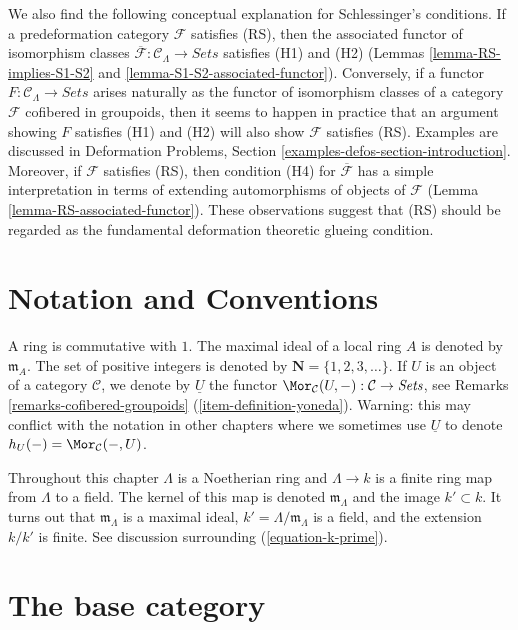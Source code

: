 \medskip\noindent
We also find the following conceptual explanation for Schlessinger's
conditions. If a predeformation category $\mathcal{F}$ satisfies (RS),
then the associated functor of isomorphism classes
$\overline{\mathcal{F}}: \mathcal{C}_\Lambda \to \textit{Sets}$
satisfies (H1) and (H2)
(Lemmas \ref{lemma-RS-implies-S1-S2} and
\ref{lemma-S1-S2-associated-functor}).
Conversely, if a functor
$F : \mathcal{C}_\Lambda \to \textit{Sets}$
arises naturally as the functor of isomorphism classes of
a category $\mathcal{F}$ cofibered in groupoids, then it seems to happen in
practice that an argument showing $F$ satisfies (H1) and (H2) will also show
$\mathcal{F}$ satisfies (RS). Examples are discussed in
Deformation Problems, Section
\ref{examples-defos-section-introduction}.
Moreover, if $\mathcal{F}$ satisfies (RS), then condition
(H4) for $\overline{\mathcal{F}}$ has a simple interpretation in terms of
extending automorphisms of objects of $\mathcal{F}$
(Lemma \ref{lemma-RS-associated-functor}).
These observations suggest that (RS) should be regarded as the
fundamental deformation theoretic glueing condition.




\section{Notation and Conventions}
\label{section-notations-conventions}

\noindent
A ring is commutative with $1$. The  maximal ideal of a local ring $A$
is denoted by $\mathfrak{m}_A$. The set of positive integers is denoted
by $\mathbf{N} = \{1, 2, 3, \ldots\}$. If $U$ is an object of a
category $\mathcal{C}$, we denote by $\underline{U}$
the functor
$\Mor_\mathcal{C}(U, -): \mathcal{C} \to \textit{Sets}$, see
Remarks \ref{remarks-cofibered-groupoids} (\ref{item-definition-yoneda}).
Warning: this may conflict with the notation in other chapters where we
sometimes use $\underline{U}$ to denote $h_U(-) = \Mor_\mathcal{C}(-, U)$.

\medskip\noindent
Throughout this chapter $\Lambda$ is a Noetherian ring and
$\Lambda \to k$ is a finite ring map from $\Lambda$ to a field.
The kernel of this map is denoted $\mathfrak m_\Lambda$ and the
image $k' \subset k$. It turns out that $\mathfrak m_\Lambda$ is
a maximal ideal, $k' = \Lambda/\mathfrak m_\Lambda$ is a field, and
the extension $k/k'$ is finite. See discussion surrounding
(\ref{equation-k-prime}).


\section{The base category}
\label{section-CLambda}

